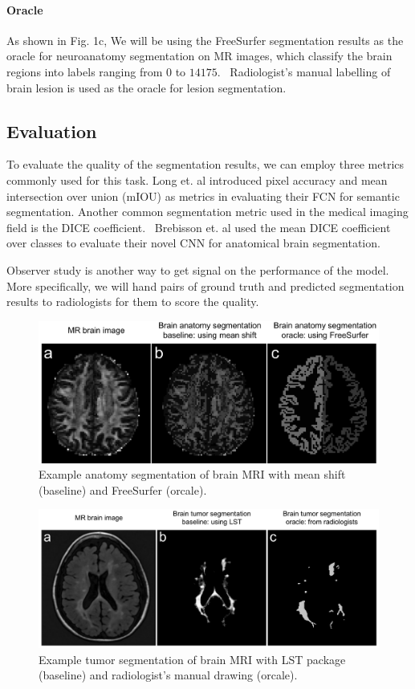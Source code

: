 \documentclass{article}
\begin{document}
\paragraph{Oracle}
As shown in Fig. 1c, We will be using the FreeSurfer segmentation results as the oracle for neuroanatomy segmentation on MR images, which classify the brain regions into labels ranging from $0$ to $14175$.~\cite{freesurfercolorlut}  Radiologist's manual labelling of brain lesion is used as the oracle for lesion segmentation.

\subsection{Evaluation}
To evaluate the quality of the segmentation results, we can employ three metrics commonly used for this task. Long et. al introduced pixel accuracy and mean intersection over union (mIOU) as metrics in evaluating their FCN for semantic segmentation. Another common segmentation metric used in the medical imaging field is the DICE coefficient.~\cite{dice1945measures} Brebisson et. al used the mean DICE coefficient over classes to evaluate their novel CNN for anatomical brain segmentation.

Observer study is another way to get signal on the performance of the model. More specifically, we will hand pairs of ground truth and predicted segmentation results to radiologists for them to score the quality.

\newpage
\begin{figure}[H]
\includegraphics[width=\textwidth]{img/Picture1.png}
\caption{Example anatomy segmentation of brain MRI with mean shift (baseline) and FreeSurfer (orcale).}
\label{fig1:anatomy}
\end{figure}

\begin{figure}[H]
\includegraphics[width=\textwidth]{img/Picture2.png}
\caption{Example tumor segmentation of brain MRI with LST package (baseline) and radiologist's manual drawing (orcale).}
\label{fig2:tumor}
\end{figure}


  
\end{document}
